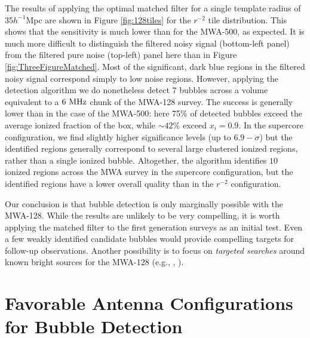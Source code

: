 The results of applying the optimal matched filter for a
single template radius of 35$h^{-1}$Mpc are shown in Figure
\ref{fig:128tiles} for the $r^{-2}$ tile distribution. This
shows that the sensitivity is much lower than for the MWA-500, as
expected. It is much more difficult to distinguish the filtered noisy
signal (bottom-left panel) from the filtered pure noise (top-left) panel here than in 
Figure \ref{fig:ThreeFigureMatched}. Most of the significant, dark blue regions in the filtered noisy
signal correspond simply to low noise regions. However, applying the detection algorithm
we do nonetheless detect $7$ bubbles across a volume equivalent to a $6 \ \text{MHz}$ chunk of the MWA-128 survey.
The success is generally lower than in the case of the MWA-500: here
75\% of detected bubbles exceed the average
ionized fraction of the box, while $\sim 42\%$ exceed $x_i =
0.9$. In the supercore configuration, we find slightly higher significance levels (up to $6.9-\sigma$)
but the identified regions generally correspond to several large clustered ionized regions,
rather than a single ionized bubble. Altogether, the algorithm identifies $10$ ionized regions
across the MWA survey in the supercore configuration, but the identified regions have a lower overall quality than
in the $r^{-2}$ configuration. 

Our conclusion is that bubble detection is only marginally possible with the MWA-128. While the results
are unlikely to be very compelling, it is worth applying the matched filter to the first generation
surveys as an initial test. Even a few weakly identified candidate bubbles would provide compelling targets for follow-up
observations. Another possibility is to focus on {\em targeted searches} around known bright
sources for the MWA-128 (e.g., \citealt{Wyithe:2004ta}, \citealt{Friedrich:2012fy}).



\section{Favorable Antenna Configurations for Bubble Detection} \label{sec:LOFAR}

